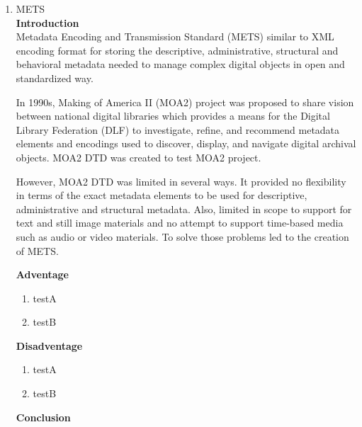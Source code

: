 \begin{enumerate}
	\item METS\\
	{\bf Introduction}\\
	Metadata Encoding and Transmission Standard (METS) similar to XML encoding format for storing the descriptive, administrative, structural and behavioral metadata needed to manage complex digital objects in open and standardized way.
	
	In 1990s, Making of America II (MOA2) project was proposed to share vision between national digital libraries which provides a means for the Digital Library Federation (DLF) to investigate, refine, and recommend metadata elements and encodings used to discover, display, and navigate digital archival objects. MOA2 DTD was created to test MOA2 project.
	
	However, MOA2 DTD was limited in several ways. It provided no flexibility in terms of the exact metadata elements to be used for descriptive, administrative and structural metadata. Also, limited in scope to support for text and still image materials and no attempt to support time-based media such as audio or video materials. To solve those problems led to the creation of METS.
	
	{\bf Adventage}
	\begin{enumerate}
		\item testA
		\item testB
	\end{enumerate}	
	{\bf Disadventage}
	\begin{enumerate}
		\item testA
		\item testB
	\end{enumerate}
	{\bf Conclusion}\\	
	

\end{enumerate}
